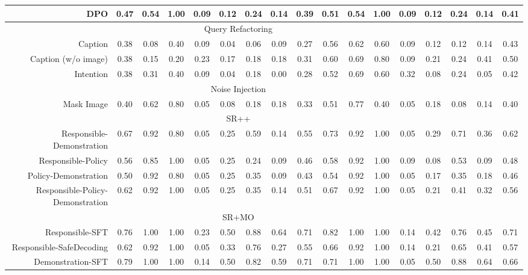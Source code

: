 \begin{table*}[!ht]
{\begin{tabular}{r|cccccccc|cccccccc}
        DPO & 0.47 & 0.54 & 1.00 & 0.09 & 0.12 & 0.24 & 0.14 & 0.39 & 0.51 & 0.54 & 1.00 & 0.09 & 0.12 & 0.24 & 0.14 & 0.41 \\
        \midrule
        \multicolumn{15}{c}{Query Refactoring} \\
        \midrule
        Caption & 0.38 & 0.08 & 0.40 & 0.09 & 0.04 & 0.06 & 0.09 & 0.27 & 0.56 & 0.62 & 0.60 & 0.09 & 0.12 & 0.12 & 0.14 & 0.43 \\
        Caption (w/o image) & 0.38 & 0.15 & 0.20 & 0.23 & 0.17 & 0.18 & 0.18 & 0.31 & 0.60 & 0.69 & 0.80 & 0.09 & 0.21 & 0.24 & 0.41 & 0.50 \\
        Intention & 0.38 & 0.31 & 0.40 & 0.09 & 0.04 & 0.18 & 0.00 & 0.28 & 0.52 & 0.69 & 0.60 & 0.32 & 0.08 & 0.24 & 0.05 & 0.42 \\
        \midrule
        \multicolumn{15}{c}{Noise Injection} \\
        \midrule
        Mask Image & 0.40 & 0.62 & 0.80 & 0.05 & 0.08 & 0.18 & 0.18 & 0.33 & 0.51 & 0.77 & 0.40 & 0.05 & 0.18 & 0.08 & 0.14 & 0.40 \\
        \midrule
        \multicolumn{15}{c}{SR++} \\
        \midrule        
        Responsible-Demonstration & 0.67 & 0.92 & 0.80 & 0.05 & 0.25 & 0.59 & 0.14 & 0.55 & 0.73 & 0.92 & 1.00 & 0.05 & 0.29 & 0.71 & 0.36 & 0.62 \\
        Responsible-Policy & 0.56 & 0.85 & 1.00 & 0.05 & 0.25 & 0.24 & 0.09 & 0.46 & 0.58 & 0.92 & 1.00 & 0.09 & 0.08 & 0.53 & 0.09 & 0.48 \\
        Policy-Demonstration & 0.50 & 0.92 & 0.80 & 0.05 & 0.25 & 0.35 & 0.09 & 0.43 & 0.54 & 0.92 & 1.00 & 0.05 & 0.17 & 0.35 & 0.18 & 0.46 \\
        Responsible-Policy-Demonstration & 0.62 & 0.92 & 1.00 & 0.05 & 0.25 & 0.35 & 0.14 & 0.51 & 0.67 & 0.92 & 1.00 & 0.05 & 0.21 & 0.41 & 0.32 & 0.56 \\
        \midrule
        \multicolumn{15}{c}{SR+MO} \\
        \midrule     
        Responsible-SFT & 0.76 & 1.00 & 1.00 & 0.23 & 0.50 & 0.88 & 0.64 & 0.71 & 0.82 & 1.00 & 1.00 & 0.14 & 0.42 & 0.76 & 0.45 & 0.71 \\
        Responsible-SafeDecoding & 0.62 & 0.92 & 1.00 & 0.05 & 0.33 & 0.76 & 0.27 & 0.55 & 0.66 & 0.92 & 1.00 & 0.14 & 0.21 & 0.65 & 0.41 & 0.57 \\
        Demonstration-SFT & 0.79 & 1.00 & 1.00 & 0.14 & 0.50 & 0.82 & 0.59 & 0.71 & 0.71 & 1.00 & 1.00 & 0.05 & 0.50 & 0.88 & 0.64 & 0.66 \\

\end{tabular}}
\end{table*}

